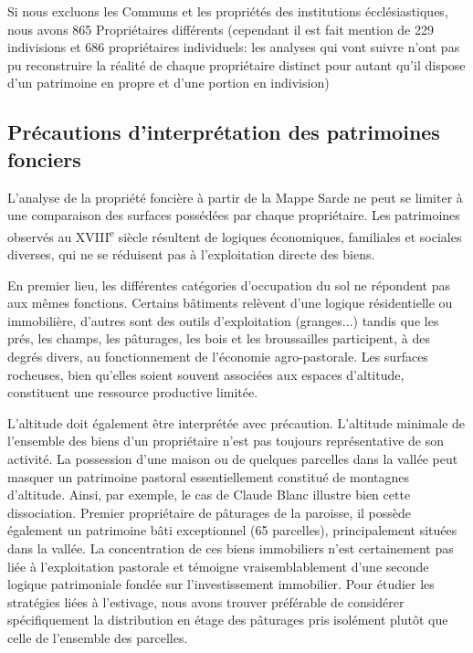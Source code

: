 \documentclass[12pt,a4paper]{report}
\begin{document}
	Si nous excluons les Communs et les propriétés des institutions écclésiastiques, nous avons 865 Propriétaires différents (cependant il est fait mention de 229 indivisions et 686 propriétaires individuels: les analyses qui vont suivre n'ont pas pu reconstruire la réalité de chaque propriétaire distinct pour autant qu'il dispose d'un patrimoine en propre et d'une portion en indivision)

	\subsection{Précautions d'interprétation des patrimoines fonciers}
	
	L'analyse de la propriété foncière à partir de la Mappe Sarde ne peut se limiter à une comparaison des surfaces possédées par chaque propriétaire. Les patrimoines observés au XVIII\textsuperscript{e} siècle résultent de logiques économiques, familiales et sociales diverses, qui ne se réduisent pas à l'exploitation directe des biens.
	
	En premier lieu, les différentes catégories d'occupation du sol ne répondent pas aux mêmes fonctions. Certains bâtiments relèvent d'une logique résidentielle ou immobilière, d'autres sont des outils d'exploitation (granges...) tandis que les prés, les champs, les pâturages, les bois et les broussailles participent, à des degrés divers, au fonctionnement de l'économie agro-pastorale. Les surfaces rocheuses, bien qu'elles soient souvent associées aux espaces d'altitude, constituent  une ressource productive limitée. 
	
	L'altitude doit également être interprétée avec précaution. L'altitude minimale de l'ensemble des biens d'un propriétaire n'est pas toujours représentative de son activité. La possession d'une maison ou de quelques parcelles dans la vallée peut masquer un patrimoine pastoral essentiellement constitué de montagnes d'altitude. 
	Ainsi, par exemple, le cas de Claude Blanc illustre bien cette dissociation. Premier propriétaire de pâturages de la paroisse, il possède également un patrimoine bâti exceptionnel (65 parcelles), principalement situées dans la vallée. La concentration de ces biens immobiliers n'est certainement pas liée à l'exploitation pastorale et témoigne vraisemblablement d'une seconde logique patrimoniale fondée sur l'investissement immobilier.
	Pour étudier les stratégies liées à l'estivage, nous avons trouver préférable de considérer spécifiquement la distribution en étage des pâturages pris isolément plutôt que celle de l'ensemble des parcelles.
	
\end{document}
